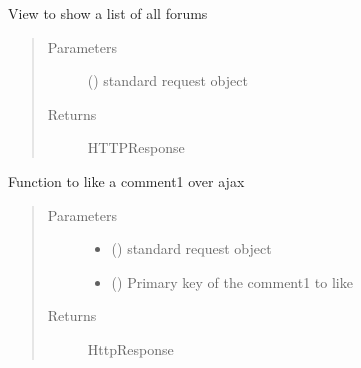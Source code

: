 \documentclass[letterpaper,10pt,english]{sphinxmanual}
\begin{document}
\begin{fulllineitems}
\label{\detokenize{forums:forums.views.forum_list}}
View to show a list of all forums
\begin{quote}\begin{description}
\item[{Parameters}] \leavevmode
{} () \textendash{} standard request object

\item[{Returns}] \leavevmode
HTTPResponse

\end{description}\end{quote}

\end{fulllineitems}


\begin{fulllineitems}
\label{\detokenize{forums:forums.views.like_comment1}}
Function to like a comment1 over ajax
\begin{quote}\begin{description}
\item[{Parameters}] \leavevmode\begin{itemize}
\item {} 
 () \textendash{} standard request object

\item {} 
 () \textendash{} Primary key of the comment1 to like

\end{itemize}

\item[{Returns}] \leavevmode
HttpResponse

\end{description}\end{quote}

\end{fulllineitems}
\end{document}
